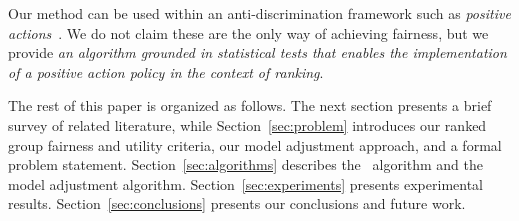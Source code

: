 Our method can be used within an anti-discrimination framework such as \emph{positive actions}~\cite{sowell2005affirmative}.
%
We do not claim these are the only way of achieving fairness, but we provide \emph{an algorithm grounded in statistical tests that enables the implementation of a positive action policy in the context of ranking}.

The rest of this paper is organized as follows.
%
The next section presents a brief survey of related literature, while Section~\ref{sec:problem} introduces our ranked group fairness and utility criteria, our model adjustment approach, and a formal problem statement.
%
Section~\ref{sec:algorithms} describes the \algoFAIR\ algorithm and the model adjustment algorithm.
%
Section~\ref{sec:experiments} presents experimental results.
%
Section~\ref{sec:conclusions} presents our conclusions and future work.
